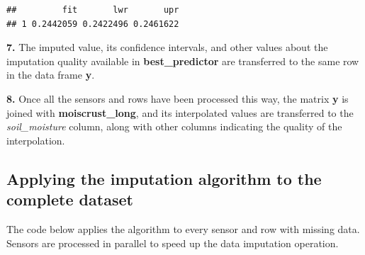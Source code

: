 \documentclass[
  table]{article}
\begin{document}
\begin{verbatim}
##         fit       lwr       upr
## 1 0.2442059 0.2422496 0.2461622
\end{verbatim}

\textbf{7.} The imputed value, its confidence intervals, and other
values about the imputation quality available in
\textbf{best\_predictor} are transferred to the same row in the data
frame \textbf{y}.

\textbf{8.} Once all the sensors and rows have been processed this way,
the matrix \textbf{y} is joined with \textbf{moiscrust\_long}, and its
interpolated values are transferred to the \emph{soil\_moisture} column,
along with other columns indicating the quality of the interpolation.

\hypertarget{applying-the-imputation-algorithm-to-the-complete-dataset}{%
\subsection{Applying the imputation algorithm to the complete
dataset}\label{applying-the-imputation-algorithm-to-the-complete-dataset}}

The code below applies the algorithm to every sensor and row with
missing data. Sensors are processed in parallel to speed up the data
imputation operation.
\end{document}
